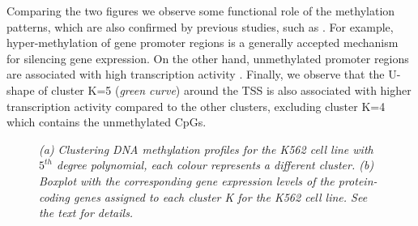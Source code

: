 Comparing the two figures we observe some functional role of the methylation patterns, which are also confirmed by previous studies, such as \citet{Vanderkraats2013}. For example, hyper-methylation of gene promoter regions is a generally accepted mechanism for silencing gene expression. On the other hand, unmethylated promoter regions are associated with high transcription activity \citep{Deaton2011}. Finally, we observe that the U-shape of cluster K=5 (\emph{green curve}) around the TSS is also associated with higher transcription activity compared to the other clusters, excluding cluster K=4 which contains the unmethylated CpGs.
\begin{figure}[ht!]
     \begin{center}
    \end{center}
    \caption{\emph{(a) Clustering DNA methylation profiles for the K562 cell line with $5^{th}$ degree polynomial, each colour represents a different cluster. (b) Boxplot with the corresponding gene expression levels of the protein-coding genes assigned to each cluster K for the K562 cell line. See the text for details.}}
   \label{meth-k562-pic}
\end{figure}
